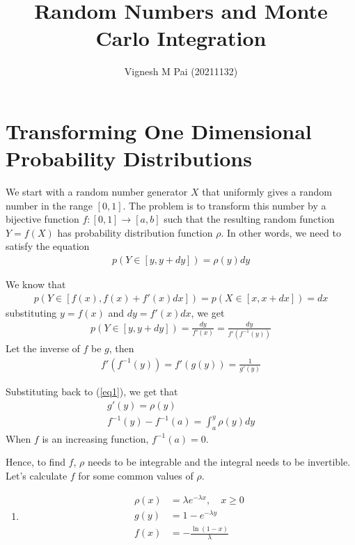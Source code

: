 \documentclass{article}
\title{Random Numbers and Monte Carlo Integration}
\author{Vignesh M Pai (20211132)}
\date{}
\begin{document}
\maketitle

\section{Transforming One Dimensional Probability Distributions}

We start with a random number generator $X$ that uniformly gives a random number in the
range $[0, 1]$. The problem is to transform this number by a bijective function $f: [0, 1] \to [a, b]$ such that the resulting
random function $Y=f(X)$ has probability distribution function $\rho$. In other words, we need to satisfy the equation
\begin{align}\label{eq1}
    p(Y \in [y, y + dy]) = \rho(y) dy
\end{align}

We know that
\begin{align}
    p(Y \in [f(x), f(x) + f'(x) dx]) = p(X \in [x, x + dx]) = dx
\end{align}
substituting $y = f(x)$ and $dy = f'(x) dx$, we get
\begin{align}
    p(Y \in [y, y + dy]) = \frac{dy}{f'(x)} = \frac{dy}{f'(f^{-1}(y))}
\end{align}
Let the inverse of $f$ be $g$, then
\begin{align}
    f'(f^{-1}(y)) = f'(g(y)) = \frac{1}{g'(y)}
\end{align}

Substituting back to (\ref{eq1}), we get that
\begin{gather*}
    g'(y) = \rho(y) \\
    f^{-1}(y) - f^{-1}(a) = \int_a^y \rho(y) dy
\end{gather*}
When $f$ is an increasing function, $f^{-1}(a) = 0$.

Hence, to find $f$, $\rho$ needs to be integrable and the integral needs to be invertible.
Let's calculate $f$ for some common values of $\rho$.

\begin{enumerate}
    \item
    \begin{align*}
        \rho(x) &= \lambda e^{-\lambda x},\quad x \geq 0 \\
        g(y) &= 1 - e^{-\lambda y} \\
        f(x) &= - \frac{\ln(1- x)}{\lambda}  
    \end{align*}
\end{enumerate}
\end{document}
